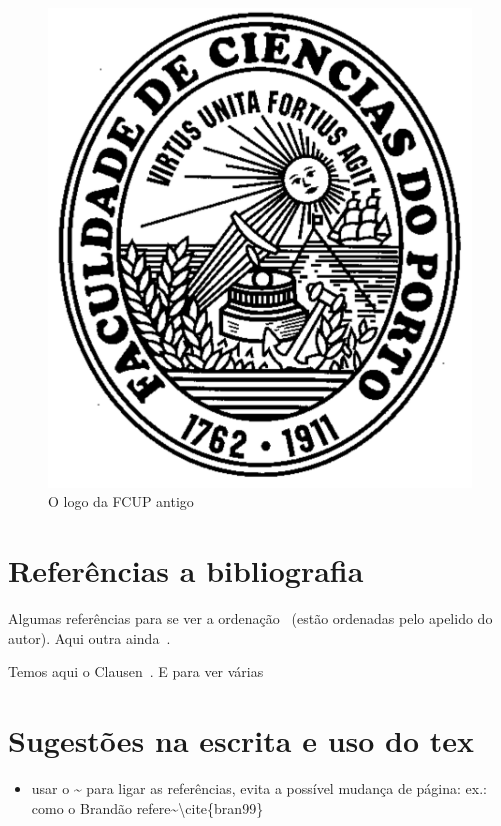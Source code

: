 \begin{figure}[htb]
   \centering %
   \includegraphics[scale=.4]{pics/fc_logo}
   \caption[FCUP logo velho]{O logo da FCUP antigo}\label{fig:logoFCUP}
\end{figure}


\section{Referências a bibliografia}
Algumas referências para se ver a ordenação~\cite{yaacoub2012} (estão ordenadas pelo apelido do autor). Aqui outra ainda~\cite{etsitr102732}.

Temos aqui o Clausen~\cite{Clausen2003}. E para ver várias~\cite{yaacoub2012, etsitr102732, strunk2007elements}


\section{Sugestões na escrita e uso do tex}
\begin{itemize}
  \item usar o \textasciitilde{} para ligar as referências, evita a possível mudança de página: ex.: como o Brandão refere\textasciitilde\textbackslash{}cite\{bran99\}

\end{itemize}
